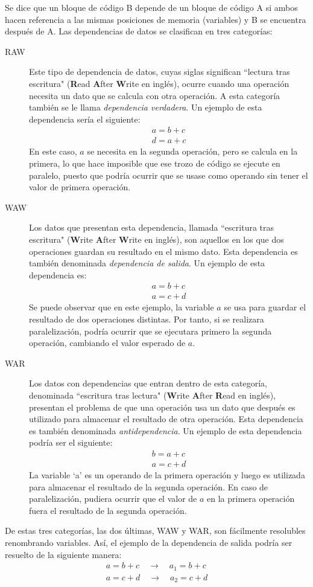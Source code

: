 \documentclass[11pt,twoside,titlepage,a4paper]{article}
\begin{document}
Se dice que un bloque de código B depende de un bloque de código A si ambos hacen referencia a las mismas
posiciones de memoria (variables) y B se encuentra después de A. Las dependencias de datos se clasifican
en tres categorías:
\begin{description}
	\item [RAW] Este tipo de dependencia de datos, cuyas siglas significan ``lectura tras escritura" 
	(\textbf Read \textbf After \textbf Write en inglés), ocurre cuando una operación necesita un dato que
	se calcula con otra operación. A esta categoría también se le llama \textit{dependencia verdadera}. Un
	ejemplo de esta dependencia sería el siguiente:
	\begin{gather*}
		a = b + c\\
		d = a + c
	\end{gather*}
	En este caso, $a$ se necesita en la segunda operación, pero se calcula en la primera, lo que
	hace imposible que ese trozo de código se ejecute en paralelo, puesto que podría ocurrir que se usase
	como operando sin tener el valor de primera operación.
	\item [WAW] Los datos que presentan esta dependencia, llamada ``escritura tras escritura" (\textbf
	Write \textbf After \textbf Write en inglés), son aquellos en los que dos operaciones guardan su
	resultado en el mismo dato. Esta dependencia es también denominada \textit{dependencia de salida}. Un
	ejemplo de esta dependencia es:
	\begin{gather*}
		a = b + c\\
		a = c + d
	\end{gather*}
	Se puede observar que en este ejemplo, la variable $a$ se usa para guardar el resultado de dos
	operaciones distintas. Por tanto, si se realizara paralelización, podría ocurrir que se ejecutara
	primero la segunda operación, cambiando el valor esperado de $a$.
	\item [WAR] Los datos con dependencias que entran dentro de esta categoría, denominada ``escritura tras
	lectura" (\textbf Write \textbf After \textbf Read en inglés), presentan el problema de que una
	operación usa un dato que después es utilizado para almacenar el resultado de otra operación. Esta
	dependencia es también denominada \textit{antidependencia}. Un ejemplo de esta dependencia podría ser
	el siguiente:
	\begin{gather*}
		b = a + c\\
		a = c + d
	\end{gather*}
	La variable `a' es un operando de la primera operación y luego es utilizada para almacenar el
	resultado de la segunda operación. En caso de paralelización, pudiera ocurrir que el valor de $a$ en
	la primera operación fuera el resultado de la segunda operación.
\end{description}
De estas tres categorías, las dos últimas, WAW y WAR, son fácilmente resolubles renombrando variables.
Así, el ejemplo de la dependencia de salida podría ser resuelto de la siguiente manera:
\begin{gather*}
	a = b + c\quad\to\quad a_1 = b + c\\
	a = c + d\quad\to\quad a_2 = c + d
\end{gather*}
	
\end{document}
